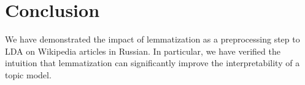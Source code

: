 \documentclass{clv2}
\begin{document}
\section{Conclusion}\label{sec:conclusion}

We have demonstrated the impact of lemmatization as a preprocessing
step to LDA on Wikipedia articles in Russian.  In particular, we have
verified the intuition that lemmatization can significantly improve the
interpretability of a topic model.




\end{document}
